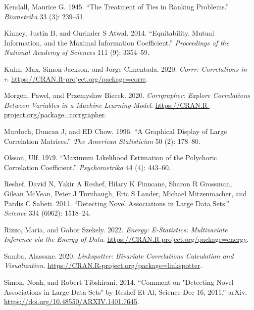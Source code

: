\begin{CSLReferences}{1}{0}
\leavevmode{}%
Kendall, Maurice G. 1945. {``The Treatment of Ties in Ranking Problems.''} \emph{Biometrika} 33 (3): 239--51.

\leavevmode{}%
Kinney, Justin B, and Gurinder S Atwal. 2014. {``Equitability, Mutual Information, and the Maximal Information Coefficient.''} \emph{Proceedings of the National Academy of Sciences} 111 (9): 3354--59.

\leavevmode{}%
Kuhn, Max, Simon Jackson, and Jorge Cimentada. 2020. \emph{Corrr: Correlations in r}. \url{https://CRAN.R-project.org/package=corrr}.

\leavevmode{}%
Morgen, Pawel, and Przemyslaw Biecek. 2020. \emph{Corrgrapher: Explore Correlations Between Variables in a Machine Learning Model}. \url{https://CRAN.R-project.org/package=corrgrapher}.

\leavevmode{}%
Murdoch, Duncan J, and ED Chow. 1996. {``A Graphical Display of Large Correlation Matrices.''} \emph{The American Statistician} 50 (2): 178--80.

\leavevmode{}%
Olsson, Ulf. 1979. {``Maximum Likelihood Estimation of the Polychoric Correlation Coefficient.''} \emph{Psychometrika} 44 (4): 443--60.

\leavevmode{}%
Reshef, David N, Yakir A Reshef, Hilary K Finucane, Sharon R Grossman, Gilean McVean, Peter J Turnbaugh, Eric S Lander, Michael Mitzenmacher, and Pardis C Sabeti. 2011. {``Detecting Novel Associations in Large Data Sets.''} \emph{Science} 334 (6062): 1518--24.

\leavevmode{}%
Rizzo, Maria, and Gabor Szekely. 2022. \emph{Energy: E-Statistics: Multivariate Inference via the Energy of Data}. \url{https://CRAN.R-project.org/package=energy}.

\leavevmode{}%
Samba, Alassane. 2020. \emph{Linkspotter: Bivariate Correlations Calculation and Visualization}. \url{https://CRAN.R-project.org/package=linkspotter}.

\leavevmode{}%
Simon, Noah, and Robert Tibshirani. 2014. {``Comment on "Detecting Novel Associations in Large Data Sets" by Reshef Et Al, Science Dec 16, 2011.''} arXiv. \url{https://doi.org/10.48550/ARXIV.1401.7645}.


\end{CSLReferences}
